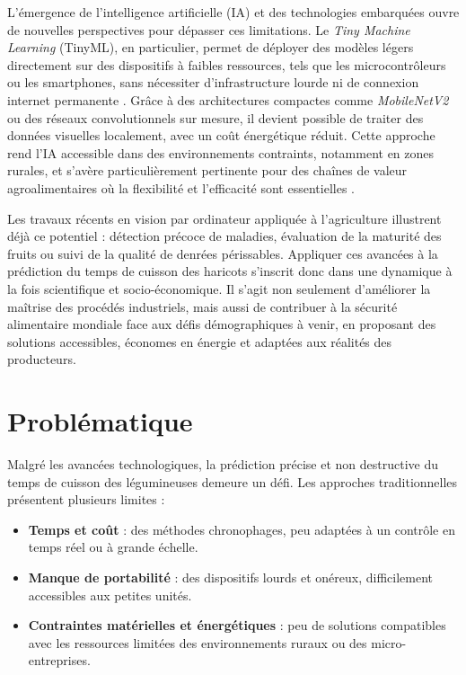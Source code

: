 L’émergence de l’intelligence artificielle (IA) et des technologies embarquées ouvre de nouvelles perspectives pour dépasser ces limitations. Le \textit{Tiny Machine Learning} (TinyML), en particulier, permet de déployer des modèles légers directement sur des dispositifs à faibles ressources, tels que les microcontrôleurs ou les smartphones, sans nécessiter d’infrastructure lourde ni de connexion internet permanente \cite{banbury2021micronets}. Grâce à des architectures compactes comme \textit{MobileNetV2} ou des réseaux convolutionnels sur mesure, il devient possible de traiter des données visuelles localement, avec un coût énergétique réduit. Cette approche rend l’IA accessible dans des environnements contraints, notamment en zones rurales, et s’avère particulièrement pertinente pour des chaînes de valeur agroalimentaires où la flexibilité et l’efficacité sont essentielles \cite{tastan2023}.

Les travaux récents en vision par ordinateur appliquée à l’agriculture illustrent déjà ce potentiel : détection précoce de maladies, évaluation de la maturité des fruits ou suivi de la qualité de denrées périssables. Appliquer ces avancées à la prédiction du temps de cuisson des haricots s’inscrit donc dans une dynamique à la fois scientifique et socio-économique. Il s’agit non seulement d’améliorer la maîtrise des procédés industriels, mais aussi de contribuer à la sécurité alimentaire mondiale face aux défis démographiques à venir, en proposant des solutions accessibles, économes en énergie et adaptées aux réalités des producteurs.

\section{Problématique}
Malgré les avancées technologiques, la prédiction précise et non destructive du temps de cuisson des légumineuses demeure un défi. Les approches traditionnelles présentent plusieurs limites :
\begin{itemize}
    \item \textbf{Temps et coût} : des méthodes chronophages, peu adaptées à un contrôle en temps réel ou à grande échelle.
    \item \textbf{Manque de portabilité} : des dispositifs lourds et onéreux, difficilement accessibles aux petites unités.
    \item \textbf{Contraintes matérielles et énergétiques} : peu de solutions compatibles avec les ressources limitées des environnements ruraux ou des micro-entreprises.
\end{itemize}

